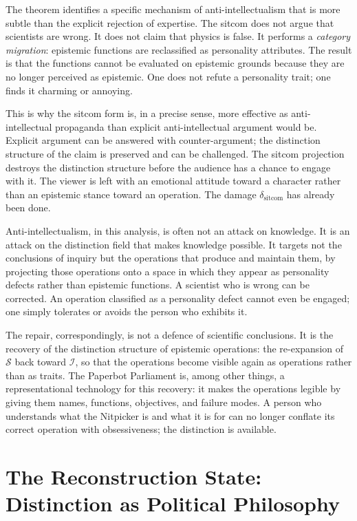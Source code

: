 \documentclass[12pt, letterpaper]{article}
\theoremstyle{remark}
\begin{document}
The theorem identifies a specific mechanism of anti-intellectualism that is
more subtle than the explicit rejection of expertise.  The sitcom does not
argue that scientists are wrong.  It does not claim that physics is false.
It performs a \emph{category migration}: epistemic functions are reclassified
as personality attributes.  The result is that the functions cannot be
evaluated on epistemic grounds because they are no longer perceived as
epistemic.  One does not refute a personality trait; one finds it charming
or annoying.

This is why the sitcom form is, in a precise sense, more effective as
anti-intellectual propaganda than explicit anti-intellectual argument would
be.  Explicit argument can be answered with counter-argument; the distinction
structure of the claim is preserved and can be challenged.  The sitcom
projection destroys the distinction structure before the audience has a chance
to engage with it.  The viewer is left with an emotional attitude toward a
character rather than an epistemic stance toward an operation.  The damage
$\delta_{\text{sitcom}}$ has already been done.

Anti-intellectualism, in this analysis, is often not an attack on knowledge.
It is an attack on the distinction field that makes knowledge possible.  It
targets not the conclusions of inquiry but the operations that produce and
maintain them, by projecting those operations onto a space in which they
appear as personality defects rather than epistemic functions.  A scientist
who is wrong can be corrected.  An operation classified as a personality
defect cannot even be engaged; one simply tolerates or avoids the person
who exhibits it.

The repair, correspondingly, is not a defence of scientific conclusions.
It is the recovery of the distinction structure of epistemic operations:
the re-expansion of $\mathcal{S}$ back toward $\mathcal{I}$, so that the
operations become visible again as operations rather than as traits.  The
Paperbot Parliament is, among other things, a representational technology
for this recovery: it makes the operations legible by giving them names,
functions, objectives, and failure modes.  A person who understands what the
Nitpicker is and what it is for can no longer conflate its correct operation
with obsessiveness; the distinction is available.

\section{The Reconstruction State: Distinction as Political Philosophy}
\end{document}

